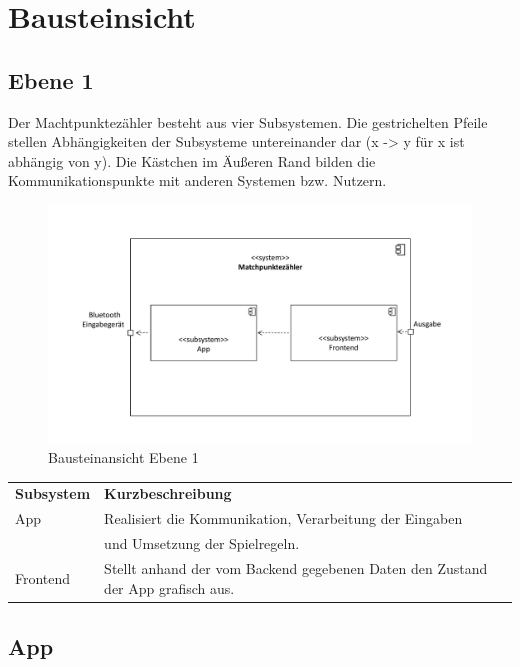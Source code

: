 \chapter{Bausteinsicht}

\section{Ebene 1}

Der Machtpunktezähler besteht aus vier Subsystemen. Die gestrichelten Pfeile stellen Abhängigkeiten der Subsysteme untereinander dar (x -> y für x ist abhängig von y). Die Kästchen im Äußeren Rand bilden die Kommunikationspunkte mit anderen Systemen bzw. Nutzern.

\begin{figure}[h]
\begin{center}
\includegraphics[scale=0.5]{Grafiken/Baustein_1.pdf}
\caption{Bausteinansicht Ebene 1}
\end{center}
\end{figure}

\begin{center}
\begin{tabular}[h]{|l|l|}
\cline{1-2}
\textbf{Subsystem} & \textbf{Kurzbeschreibung}\\
\cline{1-2}
App & Realisiert die Kommunikation, Verarbeitung der Eingaben\\&und Umsetzung der Spielregeln.\\ 
\cline{1-2}
Frontend & Stellt anhand der vom Backend gegebenen Daten den Zustand der App grafisch aus.\\
\cline{1-2} 
\end{tabular}
\end{center}

\section{App}
